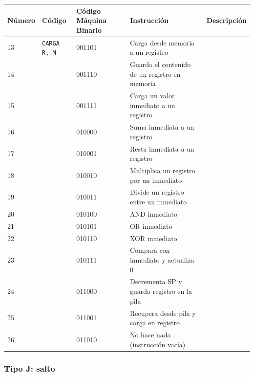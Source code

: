\documentclass{article}
\begin{document}
\begin{table}[H]
    \centering
    \begin{tabular}{|p{1.3cm}|p{3cm}|p{1.6cm}|p{5cm}|p{4cm}|}
    \hline
    \textbf{Número} & \textbf{Código} & \textbf{Código Máquina Binario} & \textbf{Instrucción} & \textbf{Descripción} \\
    \hline
    13 & \texttt{CARGA R, M} & 001101 & Carga desde memoria a un registro & \\
    \hline
    14 & & 001110 & Guarda el contenido de un registro en memoria & \\
    \hline
    15 & & 001111 & Carga un valor inmediato a un registro & \\
    \hline
    16 & & 010000 & Suma inmediata a un registro & \\
    \hline
    17 & & 010001 & Resta inmediata a un registro & \\
    \hline
    18 & & 010010 & Multiplica un registro por un inmediato & \\
    \hline
    19 & & 010011 & Divide un registro entre un inmediato & \\
    \hline
    20 & & 010100 & AND inmediato & \\
    \hline
    21 & & 010101 & OR inmediato & \\
    \hline
    22 & & 010110 & XOR inmediato & \\
    \hline
    23 & & 010111 & Compara con inmediato y actualiza 0 & \\
    \hline
    24 & & 011000 & Decrementa SP y guarda registro en la pila & \\
    \hline
    25 & & 011001 & Recupera desde pila y carga en registro & \\
    \hline
    26 & & 011010 & No hace nada (instrucción vacía) & \\
    \hline
    \end{tabular}
\end{table}

\subsubsection{Tipo J: \textbf{salto}}
\end{document}
